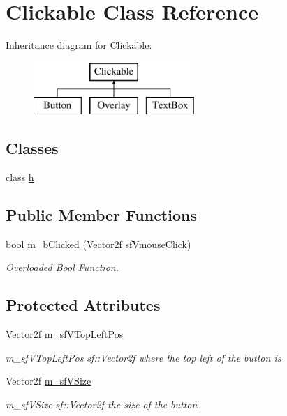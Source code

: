 \hypertarget{class_clickable}{}\section{Clickable Class Reference}
\label{class_clickable}
Inheritance diagram for Clickable\+:\begin{figure}[H]
\begin{center}
\leavevmode
\includegraphics[height=2.000000cm]{class_clickable}
\end{center}
\end{figure}
\subsection*{Classes}
\begin{DoxyCompactItemize}
\item 
class \hyperlink{class_clickable_1_1h}{h}
\end{DoxyCompactItemize}
\subsection*{Public Member Functions}
\begin{DoxyCompactItemize}
\item 
bool \hyperlink{class_clickable_a18e5ca51c572c9cb8a64dced28ccec09}{m\+\_\+b\+Clicked} (Vector2f sf\+Vmouse\+Click)
\begin{DoxyCompactList}\small\item\em Overloaded Bool Function. \end{DoxyCompactList}\end{DoxyCompactItemize}
\subsection*{Protected Attributes}
\begin{DoxyCompactItemize}
\item 
\hypertarget{class_clickable_a220f75f818fc4f3b973c1531044816be}{}\label{class_clickable_a220f75f818fc4f3b973c1531044816be} 
Vector2f \hyperlink{class_clickable_a220f75f818fc4f3b973c1531044816be}{m\+\_\+sf\+V\+Top\+Left\+Pos}
\begin{DoxyCompactList}\small\item\em m\+\_\+sf\+V\+Top\+Left\+Pos sf\+::\+Vector2f where the top left of the button is \end{DoxyCompactList}\item 
\hypertarget{class_clickable_a49ad5930a2e78bd3adfb414115005351}{}\label{class_clickable_a49ad5930a2e78bd3adfb414115005351} 
Vector2f \hyperlink{class_clickable_a49ad5930a2e78bd3adfb414115005351}{m\+\_\+sf\+V\+Size}
\begin{DoxyCompactList}\small\item\em m\+\_\+sf\+V\+Size sf\+::\+Vector2f the size of the button \end{DoxyCompactList}\end{DoxyCompactItemize}


